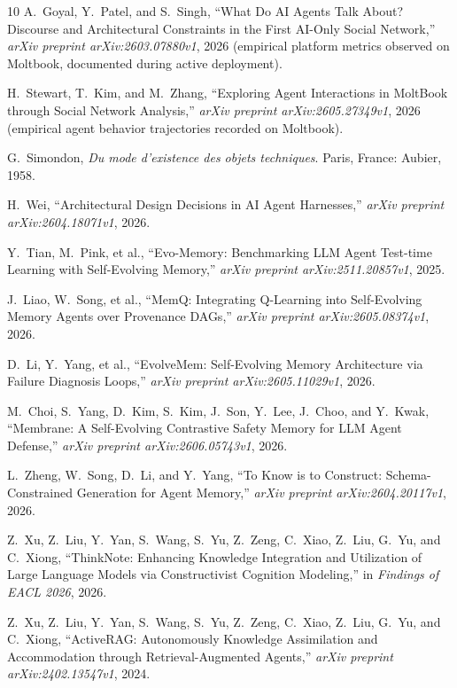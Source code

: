 \documentclass[10pt,journal,compsoc]{IEEEtran}
\begin{document}
\begin{thebibliography}{10}
A.~Goyal, Y.~Patel, and S.~Singh, ``What Do AI Agents Talk About? Discourse and Architectural Constraints in the First AI-Only Social Network,'' {\em arXiv preprint arXiv:2603.07880v1}, 2026 (empirical platform metrics observed on Moltbook, documented during active deployment).

H.~Stewart, T.~Kim, and M.~Zhang, ``Exploring Agent Interactions in MoltBook through Social Network Analysis,'' {\em arXiv preprint arXiv:2605.27349v1}, 2026 (empirical agent behavior trajectories recorded on Moltbook).

G.~Simondon, {\em Du mode d'existence des objets techniques}. Paris, France: Aubier, 1958.

H.~Wei, ``Architectural Design Decisions in AI Agent Harnesses,'' {\em arXiv preprint arXiv:2604.18071v1}, 2026.

Y.~Tian, M.~Pink, et al., ``Evo-Memory: Benchmarking LLM Agent Test-time Learning with Self-Evolving Memory,'' {\em arXiv preprint arXiv:2511.20857v1}, 2025.

J.~Liao, W.~Song, et al., ``MemQ: Integrating Q-Learning into Self-Evolving Memory Agents over Provenance DAGs,'' {\em arXiv preprint arXiv:2605.08374v1}, 2026.

D.~Li, Y.~Yang, et al., ``EvolveMem: Self-Evolving Memory Architecture via Failure Diagnosis Loops,'' {\em arXiv preprint arXiv:2605.11029v1}, 2026.

M.~Choi, S.~Yang, D.~Kim, S.~Kim, J.~Son, Y.~Lee, J.~Choo, and Y.~Kwak, ``Membrane: A Self-Evolving Contrastive Safety Memory for LLM Agent Defense,'' {\em arXiv preprint arXiv:2606.05743v1}, 2026.

L.~Zheng, W.~Song, D.~Li, and Y.~Yang, ``To Know is to Construct: Schema-Constrained Generation for Agent Memory,'' {\em arXiv preprint arXiv:2604.20117v1}, 2026.

Z.~Xu, Z.~Liu, Y.~Yan, S.~Wang, S.~Yu, Z.~Zeng, C.~Xiao, Z.~Liu, G.~Yu, and C.~Xiong, ``ThinkNote: Enhancing Knowledge Integration and Utilization of Large Language Models via Constructivist Cognition Modeling,'' in {\em Findings of EACL 2026}, 2026.

Z.~Xu, Z.~Liu, Y.~Yan, S.~Wang, S.~Yu, Z.~Zeng, C.~Xiao, Z.~Liu, G.~Yu, and C.~Xiong, ``ActiveRAG: Autonomously Knowledge Assimilation and Accommodation through Retrieval-Augmented Agents,'' {\em arXiv preprint arXiv:2402.13547v1}, 2024.


\end{thebibliography}
\end{document}
